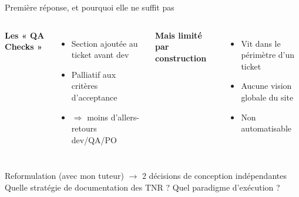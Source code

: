\begin{frame}{Première réponse, et pourquoi elle ne suffit pas}
  \begin{columns}[T]
    \textbf{Les « QA Checks »}
    \begin{itemize}\footnotesize
      \item Section ajoutée au ticket avant dev
      \item Palliatif aux critères d'acceptance
      \item $\Rightarrow$ moins d'allers-retours dev/QA/PO
    \end{itemize}
    \textbf{Mais limité par construction}
    \begin{itemize}\footnotesize
      \item Vit dans le périmètre d'un ticket
      \item Aucune vision globale du site
      \item Non automatisable
    \end{itemize}
  \end{columns}
  \vskip 8pt
  \begin{alertblock}{Reformulation (avec mon tuteur) $\to$ 2 décisions de conception indépendantes}
    Quelle \alert{stratégie de documentation} des TNR ? \quad Quel \alert{paradigme d'exécution} ?
  \end{alertblock}
\end{frame}
